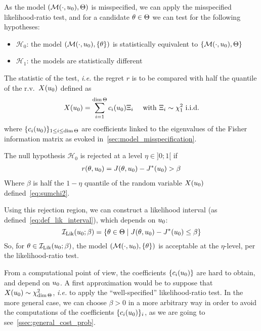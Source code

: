 \documentclass[../../Main_ManuscritThese.tex]{subfiles}
\begin{document}
  
  As the model $(\mathcal{M}(\cdot, u_0), \Theta)$ is misspecified,
  we can apply the misspecified likelihood-ratio test, and for a
  candidate $\theta\in \Theta$ we can test for the following hypotheses:
 \begin{itemize}
 \item $\mathcal{H}_0$: the model $\left(\mathcal{M}(\cdot, u_0), \{\theta\}\right)$ is statistically equivalent to $\left\{\mathcal{M}(\cdot, u_0), \Theta\right\}$
 \item $\mathcal{H}_1$: the models are statistically different
 \end{itemize}
 The statistic of the test, \emph{i.e.} the regret $r$ is to be
 compared with half the quantile of the r.v.\ $X(u_0)$ defined as
  \begin{equation}
    \label{eq:sumchi2}
X(u_0)=\sum_{i=1}^{\dim \Theta} c_i(u_0) \Xi_i \quad \text{ with } \Xi_i \sim \chi^2_1 \text{ i.i.d.}
\end{equation}
where $\{c_i(u_0)\}_{1\leq i \leq \dim \Theta}$ are coefficients
linked to the eigenvalues of the Fisher information matrix as evoked
in~\cref{sec:model_misspecification}.
 
 The null hypothesis $\mathcal{H}_0$ is rejected at a level
 $\eta \in ]0;1[$ if
  \begin{align}
    r(\theta, u_0)=J(\theta, u_0) - J^*(u_0) > \beta 
  \end{align}
  Where $\beta$ is half the $1-\eta$ quantile of the random variable $X(u_0)$ defined~\eqref{eq:sumchi2}.
  
 Using this rejection region, we can construct a likelihood interval (as defined~\cref{eq:def_lik_interval}), which depends on $u_0$:
  \begin{equation}
    \label{eq:lik_interval_add}
    \mathcal{I}_{\mathrm{Lik}}(u_0; \beta) = \left\{\theta\in \Theta \mid  J(\theta, u_0) - J^*(u_0) \leq \beta\right\}
  \end{equation}
  So, for $\theta \in \mathcal{I}_{\mathrm{Lik}}(u_0;\beta)$, the model
  $(\mathcal{M}(\cdot, u_0),\{\theta\})$ is acceptable at the
  $\eta$-level, per the likelihood-ratio test.

  
  From a computational point of view, the coefficients
  $\{c_i(u_0)\}$ are hard to obtain, and depend on $u_0$. A first
  approximation would be to suppose that
  $X(u_0) \sim \chi^2_{\dim \Theta}$, \emph{i.e.} to apply the
  ``well-specified'' likelihood-ratio test. In the more general case,
  we can choose $\beta>0$ in a more arbitrary way in order to avoid
  the computations of the coefficients $\{c_i(u_0)\}_i$, as we are
  going to see~\cref{ssec:general_cost_prob}.
  
\end{document}
